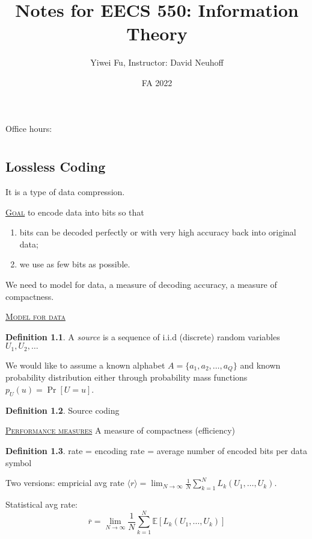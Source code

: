 \documentclass{report}
\newcommand{\fancyem}[1]{\underline{\textsc{#1}}}
\theoremstyle{definition}
\newtheorem{definition}{Definition}[section]
\theoremstyle{remark}
\numberwithin{equation}{section}
\begin{document}
\title{Notes for EECS 550: Information Theory}
\author{Yiwei Fu, Instructor: David Neuhoff}
\date{FA 2022}
\maketitle


\tableofcontents
Office hours: 

\clearpage
{}

\chapter{}

\section{Lossless Coding}
It is a type of data compression.

\fancyem{Goal} to encode data into bits so that \begin{enumerate}
  \item bits can be decoded perfectly or with very high accuracy back into original data;
  \item we use as few bits as possible.
\end{enumerate}

We need to model for data, a measure of decoding accuracy, a measure of compactness.

\fancyem{Model for data}
\begin{definition}
  A \emph{source} is a sequence of i.i.d (discrete) random variables $U_1, U_2, \ldots$
\end{definition}
We would like to assume a known alphabet $A = \{a_1, a_2, \ldots, a_Q\}$ and known probability distribution either through probability mass functions $p_U(u) = \Pr[U = u]$.

\begin{definition}
  Source coding
\end{definition}

\fancyem{Performance measures}
A measure of compactness (efficiency)

\begin{definition}
  rate = encoding rate = average number of encoded bits per data symbol
\end{definition}
  Two versions:
  empricial avg rate $\langle r \rangle = \lim_{N \to \infty} \frac{1}{N}\sum_{k=1}^N L_k(U_1, \ldots, U_k)$.

  Statistical avg rate:
  \[
    \overline{r} = \lim_{N \to \infty} \frac{1}{N}\sum_{k=1}^N \mathbb{E}[L_k(U_1, \ldots, U_k)]
  \]
\end{document}
